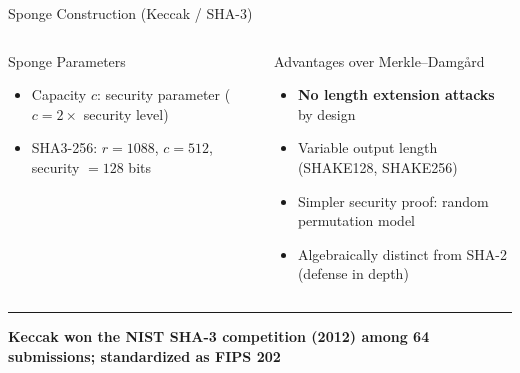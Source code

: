 \documentclass[8pt,aspectratio=169]{beamer}
\newcommand{\bottomnote}[1]{\vfill\vspace{-2mm}\textcolor{mllavender2}{\rule{\textwidth}{0.4pt}}\vspace{1mm}\footnotesize\textbf{#1}}
\begin{document}
\begin{frame}{Sponge Construction (Keccak / SHA-3)}
\begin{columns}
\begin{block}{Sponge Parameters}
\begin{itemize}
  \item Capacity $c$: security parameter ($c = 2 \times$ security level)
  \item SHA3-256: $r=1088$, $c=512$, security $= 128$ bits
\end{itemize}
\end{block}
\begin{block}{Advantages over Merkle--Damg\r{a}rd}
\begin{itemize}\small
  \item \textbf{No length extension attacks} by design
  \item Variable output length (SHAKE128, SHAKE256)
  \item Simpler security proof: random permutation model
  \item Algebraically distinct from SHA-2 (defense in depth)
\end{itemize}
\end{block}
\end{columns}
\bottomnote{Keccak won the NIST SHA-3 competition (2012) among 64 submissions; standardized as FIPS 202}
\end{frame}
\end{document}
